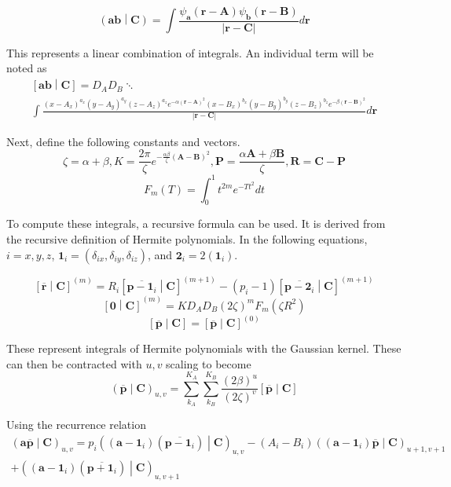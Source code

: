 \documentclass[12pt]{article}
\begin{document}
$$\left(\mathbf{a}\mathbf{b}\middle|\mathbf{C}\right) = \int\frac{\psi_{\mathbf{a}}(\mathbf{r} - \mathbf{A}) \psi_{\mathbf{b}}(\mathbf{r} - \mathbf{B})}{\left|\mathbf{r} - \mathbf{C}\right|} d\mathbf{r}$$

This represents a linear combination of integrals. An individual term will be noted as
\begin{multline*}
  \left[\mathbf{a}\mathbf{b}\middle|\mathbf{C}\right] = D_AD_B\ddots\\
  \int\frac{\left(x - A_x\right)^{a_x}\left(y - A_y\right)^{a_y}\left(z - A_z\right)^{a_z} e^{-\alpha\left(\mathbf{r} - \mathbf{A}\right)^2}\left(x - B_x\right)^{b_x}\left(y - B_y\right)^{b_y}\left(z - B_z\right)^{b_z} e^{-\beta\left(\mathbf{r} - \mathbf{B}\right)^2}}{\left|\mathbf{r} - \mathbf{C}\right|} d\mathbf{r}
\end{multline*}

Next, define the following constants and vectors.
$$\zeta = \alpha + \beta, K = \frac{2\pi}{\zeta}e^{-\frac{\alpha\beta}{\zeta}\left(\mathbf{A} - \mathbf{B}\right)^2}, \mathbf{P} = \frac{\alpha\mathbf{A} + \beta\mathbf{B}}{\zeta}, \mathbf{R} = \mathbf{C} - \mathbf{P}$$
$$F_m(T) = \int_0^1 t^{2m} e^{-Tt^2} dt$$

To compute these integrals, a recursive formula can be used. It is derived from the recursive definition of Hermite polynomials. In the following equations, $i = x, y, z$, $\mathbf{1}_i = \left(\delta_{ix}, \delta_{iy}, \delta_{iz}\right)$, and $\mathbf{2}_i = 2\left(\mathbf{1}_i\right)$.

$$\left[\overline{\mathbf{r}}\middle|\mathbf{C}\right]^{(m)} = R_i\left[\overline{\mathbf{p} - \mathbf{1}_i}\middle|\mathbf{C}\right]^{(m + 1)} - (p_i - 1)\left[\overline{\mathbf{p} - \mathbf{2}_i}\middle|\mathbf{C}\right]^{(m + 1)}$$
$$\left[\mathbf{0}\middle|\mathbf{C}\right]^{(m)} = KD_AD_B(2\zeta)^mF_m\left(\zeta R^2\right)$$
$$\left[\overline{\mathbf{p}}\middle|\mathbf{C}\right] = \left[\overline{\mathbf{p}}\middle|\mathbf{C}\right]^{(0)}$$

These represent integrals of Hermite polynomials with the Gaussian kernel. These can then be contracted with $u,v$ scaling to become
$$\left(\overline{\mathbf{p}}\middle|\mathbf{C}\right)_{u,v} = \sum_{k_A}^{K_A}\sum_{k_B}^{K_B} \frac{\left(2\beta\right)^u}{\left(2\zeta\right)^v}\left[\overline{\mathbf{p}}\middle|\mathbf{C}\right]$$

Using the recurrence relation
\begin{multline*}
  \left(\mathbf{a}\overline{\mathbf{p}}\middle|\mathbf{C}\right)_{u,v} = p_i\left(\left(\mathbf{a} - \mathbf{1}_i\right)\left(\overline{\mathbf{p} - \mathbf{1}_i}\right)\middle|\mathbf{C}\right)_{u,v} - \left(A_i - B_i\right) \left(\left(\mathbf{a} - \mathbf{1}_i\right)\overline{\mathbf{p}}\middle|\mathbf{C}\right)_{u+1,v+1} \\
  + \left(\left(\mathbf{a} - \mathbf{1}_i\right)\left(\overline{\mathbf{p} + \mathbf{1}_i}\right)\middle|\mathbf{C}\right)_{u,v+1}
\end{multline*}
\end{document}
